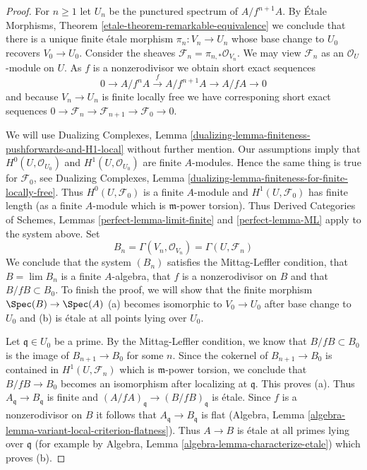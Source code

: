\begin{proof}
For $n \geq 1$ let $U_n$ be the punctured spectrum of $A/f^{n + 1}A$.
By \'Etale Morphisms, Theorem \ref{etale-theorem-remarkable-equivalence}
we conclude that there is a unique finite \'etale morphism
$\pi_n : V_n \to U_n$ whose base change to $U_0$ recovers $V_0 \to U_0$.
Consider the sheaves $\mathcal{F}_n = \pi_{n, *}\mathcal{O}_{V_n}$.
We may view $\mathcal{F}_n$ as an $\mathcal{O}_U$-module on $U$.
As $f$ is a nonzerodivisor we obtain short exact sequences
$$
0 \to A/f^nA \xrightarrow{f} A/f^{n + 1}A \to A/fA \to 0
$$
and because $V_n \to U_n$ is finite locally free we have corresponing
short exact sequences
$0 \to \mathcal{F}_n \to \mathcal{F}_{n + 1} \to \mathcal{F}_0 \to 0$.

\medskip\noindent
We will use Dualizing Complexes, Lemma
\ref{dualizing-lemma-finiteness-pushforwards-and-H1-local}
without further mention.
Our assumptions imply that $H^0(U, \mathcal{O}_{U_0})$ and
$H^1(U, \mathcal{O}_{U_0})$ are finite $A$-modules.
Hence the same thing is true for $\mathcal{F}_0$, see
Dualizing Complexes, Lemma
\ref{dualizing-lemma-finiteness-for-finite-locally-free}.
Thus $H^0(U, \mathcal{F}_0)$ is a finite $A$-module
and $H^1(U, \mathcal{F}_0)$ has finite length
(as a finite $A$-module which is $\mathfrak m$-power torsion).
Thus Derived Categories of Schemes, Lemmas \ref{perfect-lemma-limit-finite} and
\ref{perfect-lemma-ML} apply to the system above. Set
$$
B_n = \Gamma(V_n, \mathcal{O}_{V_n}) = \Gamma(U, \mathcal{F}_n)
$$
We conclude that the system $(B_n)$ satisfies the Mittag-Leffler condition,
that $B = \lim B_n$ is a finite $A$-algebra, that $f$ is a nonzerodivisor
on $B$ and that $B/fB \subset B_0$. To finish the proof,
we will show that the finite morphism
$\Spec(B) \to \Spec(A)$ (a) becomes isomorphic to $V_0 \to U_0$
after base change to $U_0$ and (b) is \'etale at all points lying
over $U_0$.

\medskip\noindent
Let $\mathfrak q \in U_0$ be a prime. By the Mittag-Leffler
condition, we know that $B/fB \subset B_0$ is the image of
$B_{n + 1} \to B_0$ for some $n$. Since the cokernel of $B_{n + 1} \to B_0$
is contained in $H^1(U, \mathcal{F}_n)$ which is $\mathfrak m$-power
torsion, we conclude that $B/fB \to B_0$ becomes an isomorphism
after localizing at $\mathfrak q$. This proves (a).
Thus $A_\mathfrak q \to B_\mathfrak q$
is finite and $(A/fA)_\mathfrak q \to (B/fB)_\mathfrak q$ is \'etale.
Since $f$ is a nonzerodivisor on $B$ it follows that
$A_\mathfrak q \to B_\mathfrak q$ is flat
(Algebra, Lemma \ref{algebra-lemma-variant-local-criterion-flatness}).
Thus $A \to B$ is \'etale at all primes lying over $\mathfrak q$
(for example by Algebra, Lemma \ref{algebra-lemma-characterize-etale})
which proves (b).
\end{proof}

